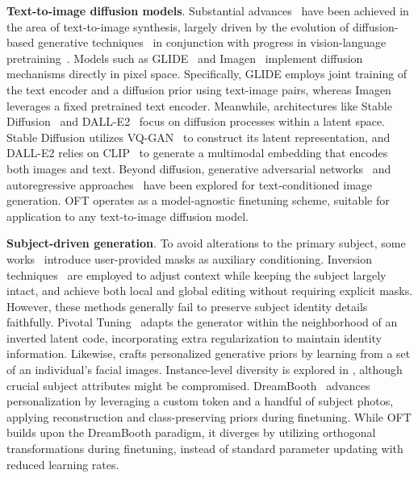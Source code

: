 \textbf{Text-to-image diffusion models}. Substantial advances~\cite{saharia2022photorealistic,ramesh2022hierarchical,rombach2022high,gu2022vector,nichol2022glide} have been achieved in the area of text-to-image synthesis, largely driven by the evolution of diffusion-based generative techniques~\cite{ho2020denoising,song2021score,song2021denoising,dhariwal2021diffusion} in conjunction with progress in vision-language pretraining~\cite{su2020vlbert,lu2019vilbert,radford2021learning,wang2021simvlm,li2022blip,li2023blip,alayrac2022flamingo,schuhmann2022laion}. Models such as GLIDE~\cite{nichol2022glide} and Imagen~\cite{saharia2022photorealistic} implement diffusion mechanisms directly in pixel space. Specifically, GLIDE employs joint training of the text encoder and a diffusion prior using text-image pairs, whereas Imagen leverages a fixed pretrained text encoder. Meanwhile, architectures like Stable Diffusion~\cite{rombach2022high} and DALL-E2~\cite{ramesh2022hierarchical} focus on diffusion processes within a latent space. Stable Diffusion utilizes VQ-GAN~\cite{esser2021taming} to construct its latent representation, and DALL-E2 relies on CLIP~\cite{radford2021learning} to generate a multimodal embedding that encodes both images and text. Beyond diffusion, generative adversarial networks~\cite{reed2016generative,zhang2017stackgan,xu2018attngan,li2019controllable} and autoregressive approaches~\cite{ramesh2021zero,ding2021cogview,wu2022nuwa,yuscaling} have been explored for text-conditioned image generation. OFT operates as a model-agnostic finetuning scheme, suitable for application to any text-to-image diffusion model.

\textbf{Subject-driven generation}. To avoid alterations to the primary subject, some works~\cite{avrahami2022blended,nichol2022glide} introduce user-provided masks as auxiliary conditioning. Inversion techniques~\cite{choi2021ilvr,dhariwal2021diffusion,ramesh2022hierarchical,gal2022image} are employed to adjust context while keeping the subject largely intact, and \cite{hertz2022prompt} achieve both local and global editing without requiring explicit masks. However, these methods generally fail to preserve subject identity details faithfully. Pivotal Tuning~\cite{roich2022pivotal} adapts the generator within the neighborhood of an inverted latent code, incorporating extra regularization to maintain identity information. Likewise, \cite{nitzan2022mystyle} crafts personalized generative priors by learning from a set of an individual's facial images. Instance-level diversity is explored in \cite{casanova2021instance}, although crucial subject attributes might be compromised. DreamBooth~\cite{ruiz2023dreambooth} advances personalization by leveraging a custom token and a handful of subject photos, applying reconstruction and class-preserving priors during finetuning. While OFT builds upon the DreamBooth paradigm, it diverges by utilizing orthogonal transformations during finetuning, instead of standard parameter updating with reduced learning rates.

